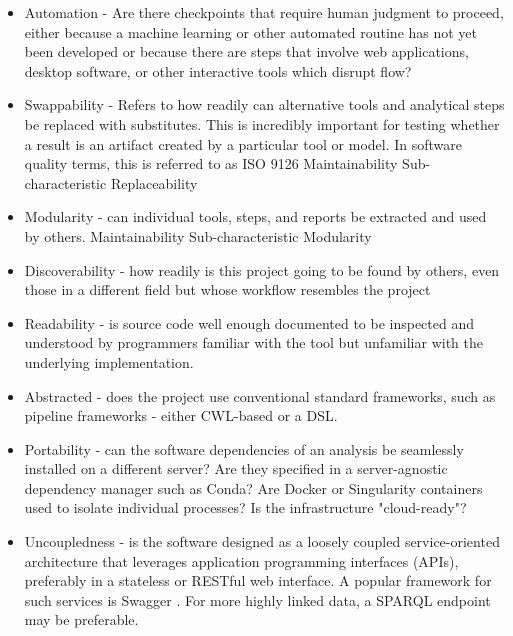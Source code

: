 \documentclass{drexelthesis}
\begin{document}
\begin{itemize}
	\item Automation - Are there checkpoints that require human judgment to proceed, either because a machine learning or other automated routine has not yet been developed or because there are steps that involve web applications, desktop software, or other interactive tools which disrupt flow?

	\item Swappability - Refers to how readily can alternative tools and analytical steps be replaced with substitutes. This is incredibly important for testing whether a result is an artifact created by a particular tool or model. In software quality terms, this is referred to as ISO 9126 Maintainability Sub-characteristic Replaceability

	\item Modularity - can individual tools, steps, and reports be extracted and used by others. Maintainability Sub-characteristic Modularity 

	\item Discoverability - how readily is this project going to be found by others, even those in a different field but whose workflow resembles the project 

	\item Readability - is source code well enough documented to be inspected and understood by programmers familiar with the tool but unfamiliar with the underlying implementation.

	\item Abstracted - does the project use conventional standard frameworks, such as pipeline frameworks - either CWL-based or a DSL\cite{Leipzig2017-hv}. 

	\item Portability - can the software dependencies of an analysis be seamlessly installed on a different server? Are they specified in a server-agnostic dependency manager such as Conda? Are Docker \cite{Schulz2016-or} or Singularity containers \cite{Kurtzer2017-wb} used to isolate individual processes? Is the infrastructure "cloud-ready"?

	\item Uncoupledness - is the software designed as a loosely coupled service-oriented architecture that leverages application programming interfaces (APIs), preferably in a stateless or RESTful web interface. A popular framework for such services is Swagger \cite{Haupt2017-ud}. For more highly linked data, a SPARQL endpoint may be preferable.\cite{Gonzalez2014-dq}


\end{itemize}
\end{document}
